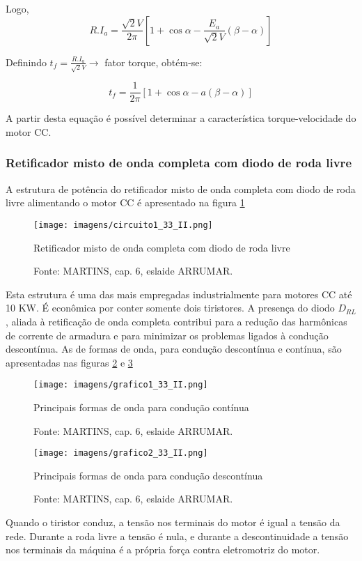 Logo,
\[R.I_{a} = \frac{\sqrt{2}V}{2\pi}\left[1 + \cos{\alpha} - \frac{E_{a}}{\sqrt{2}V}\left(\beta - \alpha\right)\right]\]

Definindo $t_{f} = \frac{R.I_{a}}{\sqrt{2}V} \rightarrow$ fator torque, obtém-se:

\[t_{f} = \frac{1}{2\pi}\left[1 + \cos{\alpha} - a\left(\beta - \alpha\right)\right]\]

A partir desta equação é possível determinar a característica torque-velocidade do motor CC.

\subsubsection{Retificador misto de onda completa com diodo de roda livre}

A estrutura de potência do retificador misto de onda completa com diodo de roda livre alimentando o motor CC é apresentado na figura \ref{fig:C1-33-II}

\begin{figure}[ht!]
\center
\texttt{[image: imagens/circuito1\_33\_II.png]}
\caption{\label{fig:C1-33-II} Retificador misto de onda completa com diodo de roda livre}
\caption*{Fonte: MARTINS, cap. 6, eslaide ARRUMAR.}
\end{figure}

Esta estrutura é uma das mais empregadas industrialmente para motores CC até 10 KW. É econômica por conter somente dois tiristores. A presença do diodo $D_{RL}$, aliada à retificação de onda completa contribui para a redução das harmônicas de corrente de armadura e para minimizar os problemas ligados à condução descontínua. As de formas de onda, para condução descontínua e contínua, são apresentadas nas figuras \ref{fig:G1-33-II} e \ref{fig:G2-33-II}

\begin{figure}[ht!]
\center
\texttt{[image: imagens/grafico1\_33\_II.png]}
\caption{\label{fig:G1-33-II} Principais formas de onda para condução contínua}
\caption*{Fonte: MARTINS, cap. 6, eslaide ARRUMAR.}
\end{figure}

\begin{figure}[ht!]
\center
\texttt{[image: imagens/grafico2\_33\_II.png]}
\caption{\label{fig:G2-33-II} Principais formas de onda para condução descontínua}
\caption*{Fonte: MARTINS, cap. 6, eslaide ARRUMAR.}
\end{figure}

Quando o tiristor conduz, a tensão nos terminais do motor é igual a tensão da rede. Durante a roda livre a tensão é nula, e durante a descontinuidade a tensão nos terminais da máquina é a própria força contra eletromotriz do motor.


